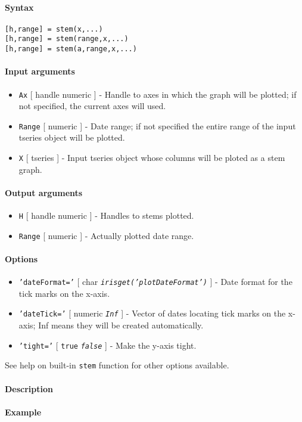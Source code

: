 


	\paragraph{Syntax}

\begin{verbatim}
[h,range] = stem(x,...)
[h,range] = stem(range,x,...)
[h,range] = stem(a,range,x,...)
\end{verbatim}

\paragraph{Input arguments}

\begin{itemize}
\item
  \texttt{Ax} {[} handle \textbar{} numeric {]} - Handle to axes in
  which the graph will be plotted; if not specified, the current axes
  will used.
\item
  \texttt{Range} {[} numeric {]} - Date range; if not specified the
  entire range of the input tseries object will be plotted.
\item
  \texttt{X} {[} tseries {]} - Input tseries object whose columns will
  be ploted as a stem graph.
\end{itemize}

\paragraph{Output arguments}

\begin{itemize}
\item
  \texttt{H} {[} handle \textbar{} numeric {]} - Handles to stems
  plotted.
\item
  \texttt{Range} {[} numeric {]} - Actually plotted date range.
\end{itemize}

\paragraph{Options}

\begin{itemize}
\item
  \texttt{'dateFormat='} {[} char \textbar{}
  \emph{\texttt{irisget('plotDateFormat')}} {]} - Date format for the
  tick marks on the x-axis.
\item
  \texttt{'dateTick='} {[} numeric \textbar{} \emph{\texttt{Inf}} {]} -
  Vector of dates locating tick marks on the x-axis; Inf means they will
  be created automatically.
\item
  \texttt{'tight='} {[} \texttt{true} \textbar{} \emph{\texttt{false}}
  {]} - Make the y-axis tight.
\end{itemize}

See help on built-in \texttt{stem} function for other options available.

\paragraph{Description}

\paragraph{Example}


